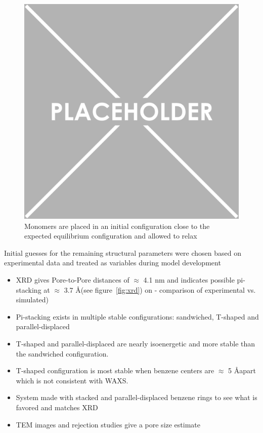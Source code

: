 \documentclass{article}
\newcommand{\angstrom}{\textup{\AA}}
\begin{document}
	\begin{figure}
	
	\includegraphics{placeholder.png}
		\caption{Monomers are placed in an initial configuration close to the expected equilibrium configuration and allowed to relax}
		\label{fig:initial}
	\end{figure}

	\noindent Initial guesses for the remaining structural parameters were chosen based on experimental data and treated as variables during model development 
	\begin{itemize}
		\item XRD gives Pore-to-Pore distances of $\approx$ 4.1 nm and indicates possible pi-stacking at $\approx$ 3.7 \angstrom (see figure~\ref{fig:xrd}) on - comparison of experimental vs. simulated)
		\item Pi-stacking exists in multiple stable configurations: sandwiched, T-shaped and parallel-displaced
		\item T-shaped and parallel-displaced are nearly isoenergetic and more stable than the sandwiched configuration.
		\item T-shaped configuration is most stable when benzene centers are $\approx$ 5 \angstrom apart which is not consistent with WAXS. %
		\item System made with stacked and parallel-displaced benzene rings to see what is favored and matches XRD
		\item TEM images and rejection studies give a pore size estimate
	\end{itemize}
\end{document}
